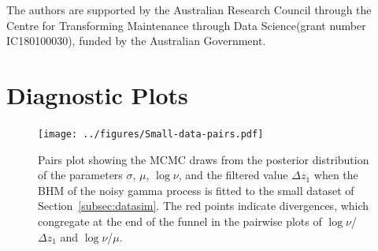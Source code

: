 \documentclass{article}
\begin{document}
The authors are supported by the Australian Research Council through the Centre for Transforming Maintenance through Data Science(grant number IC180100030), funded by the Australian Government.




\clearpage

\appendix

\section{Diagnostic Plots}\label{sec:ApdxA}

\begin{figure}[h]
    \centering
    \texttt{[image: ../figures/Small-data-pairs.pdf]}
    \caption{Pairs plot showing the MCMC draws from the posterior distribution of the parameters $\sigma$, $\mu$, $\log\nu$, and the filtered value $\Delta z_1$ when the BHM of the noisy gamma process is fitted to the small dataset of Section~\ref{subsec:datasim}. The red points indicate divergences, which congregate at the end of the funnel in the pairwise plots of $\log\nu$/$\Delta z_1$ and $\log\nu$/$\mu$.}\label{fig:small-data-pairs}
\end{figure}
\end{document}
